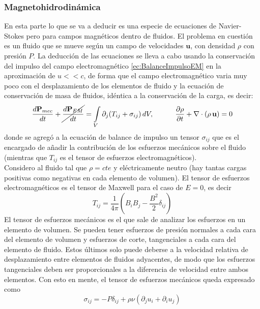\subsubsection{Magnetohidrodinámica}
En esta parte lo que se va a deducir es una especie de ecuaciones de Navier-Stokes pero para campos magnéticos dentro de fluidos. El problema en cuestión es un fluido que se mueve según un campo de velocidades $\textbf{u}$, con densidad $\rho$ con presión $P$. La deducción de las ecuaciones se lleva a cabo usando la conservación del impulso del campo electromagnético \eqref{ec:BalanceImpulsoEM} en la aproximación de $u << c$, de forma que el campo electromagnético varia muy poco con el desplazamiento de los elementos de fluido y la ecuación de conservación de masa de fluidos, idéntica a la conservación de la carga, es decir:
\begin{equation*}
    \frac{d\textbf{P}_{mec}}{dt} 
    + \cancel{\frac{d\textbf{P}_{EM}}{dt}} 
    = \int\limits_{V}\partial_{j}(T_{ij} + \sigma_{ij})\,dV,
    \quad
    \quad
    \quad
    \frac{\partial \rho}{\partial t} + \nabla \cdot
    \left(
        \rho\, \textbf{u}
    \right)
    = 0
\end{equation*}
donde se agregó a la ecuación de balance de impulso un tensor $\sigma_{ij}$ que es el encargado de añadir la contribución de los esfuerzos mecánicos sobre el fluido (mientras que $T_{ij}$ es el tensor de esfuerzos electromagnéticos).\\
\indent Considero al fluido tal que $\rho = cte$ y eléctricamente neutro (hay tantas cargas positivas como negativas en cada elemento de volumen). El tensor de esfuerzos electromagnéticos es el tensor de Maxwell para el caso de $E = 0$, es decir
\begin{equation*}
    T_{ij} = \frac{1}{4\pi}
    \left(
        B_{i}B_{j} - \frac{B^{2}}{2}\delta_{ij}
    \right)
\end{equation*}
El tensor de esfuerzos mecánicos es el que sale de analizar los esfuerzos en un elemento de volumen. Se pueden tener esfuerzos de presión normales a cada cara del elemento de volumen y esfuerzos de corte, tangenciales a cada cara del elemento de fluido. Estos últimos solo puede deberse a la velocidad relativa de desplazamiento entre elementos de fluidos adyacentes, de modo que los esfuerzos tangenciales deben ser proporcionales a la diferencia de velocidad entre ambos elementos. Con esto en mente, el tensor de esfuerzos mecánicos queda expresado como
\begin{equation*}
    \sigma_{ij} = 
    - P\delta_{ij}
    + \rho \nu
    \left(
        \partial_{j}u_{i} + \partial_{i}u_{j}
    \right)
\end{equation*}
